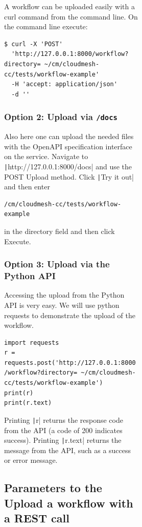 \begin{figure}[htb]
\begin{figure}[htb]
\begin{figure}[htb]
A workflow can be uploaded easily with a curl command from the command
line. On the command line execute:

\smallskip
\begin{verbatim}
$ curl -X 'POST' 
  'http://127.0.0.1:8000/workflow?directory= ~/cm/cloudmesh-cc/tests/workflow-example' 
  -H 'accept: application/json' 
  -d ''
\end{verbatim}
\smallskip

\subsubsection{\texorpdfstring{Option 2: Upload via
\texttt{/docs}}{Option 2: Upload via /docs}}\label{option-2-upload-via-docs-1}

Also here one can upload the needed files with the OpenAPI specification
interface on the service. Navigate to
\texttt|http://127.0.0.1:8000/docs| and use the POST Upload method. 
Click \texttt|Try it out| and then enter

\begin{verbatim}
/cm/cloudmesh-cc/tests/workflow-example
\end{verbatim}

in the
directory field and then click Execute.

\subsubsection{Option 3: Upload via the Python
API}\label{option-3-upload-via-the-python-api-1}

Accessing the upload from the Python API is very easy. We will use
python requests to demonstrate the upload of the workflow.

\smallskip
\begin{verbatim}
import requests
r = requests.post('http://127.0.0.1:8000 /workflow?directory= ~/cm/cloudmesh-cc/tests/workflow-example')
print(r)
print(r.text)
\end{verbatim}
\smallskip

Printing \texttt|r| returns the response code from the API (a code of
200 indicates success). Printing \texttt|r.text| returns the message
from the API, such as a success or error message.

\subsection{Parameters to the Upload a workflow with a REST
call}\label{parameters-to-the-upload-a-workflow-with-a-rest-call}


\end{figure}
\end{figure}
\end{figure}
